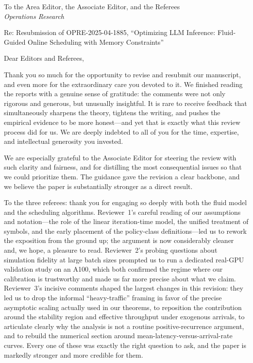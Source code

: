 \documentclass[11pt]{article}
\newcommand{\manuscript}{OPRE-2025-04-1885}
\newcommand{\papertitle}{Optimizing LLM Inference: Fluid-Guided Online Scheduling with Memory Constraints}
\begin{document}
\thispagestyle{empty}

\noindent
To the Area Editor, the Associate Editor, and the Referees\\
\emph{Operations Research}

\vspace{0.5em}

\noindent Re: Resubmission of \manuscript, ``\papertitle''

\vspace{1em}

Dear Editors and Referees,

Thank you so much for the opportunity to revise and resubmit our manuscript, and even more for the extraordinary care you devoted to it. We finished reading the reports with a genuine sense of gratitude: the comments were not only rigorous and generous, but unusually insightful. It is rare to receive feedback that simultaneously sharpens the theory, tightens the writing, and pushes the empirical evidence to be more honest---and yet that is exactly what this review process did for us. We are deeply indebted to all of you for the time, expertise, and intellectual generosity you invested.

We are especially grateful to the Associate Editor for steering the review with such clarity and fairness, and for distilling the most consequential issues so that we could prioritize them. The guidance gave the revision a clear backbone, and we believe the paper is substantially stronger as a direct result.

To the three referees: thank you for engaging so deeply with both the fluid model and the scheduling algorithms. Reviewer~1's careful reading of our assumptions and notation---the role of the linear iteration-time model, the unified treatment of symbols, and the early placement of the policy-class definitions---led us to rework the exposition from the ground up; the argument is now considerably cleaner and, we hope, a pleasure to read. Reviewer~2's probing questions about simulation fidelity at large batch sizes prompted us to run a dedicated real-GPU validation study on an A100, which both confirmed the regime where our calibration is trustworthy and made us far more precise about what we claim. Reviewer~3's incisive comments shaped the largest changes in this revision: they led us to drop the informal ``heavy-traffic'' framing in favor of the precise asymptotic scaling actually used in our theorems, to reposition the contribution around the stability region and effective throughput under exogenous arrivals, to articulate clearly why the analysis is not a routine positive-recurrence argument, and to rebuild the numerical section around mean-latency-versus-arrival-rate curves. Every one of these was exactly the right question to ask, and the paper is markedly stronger and more credible for them.
\end{document}
